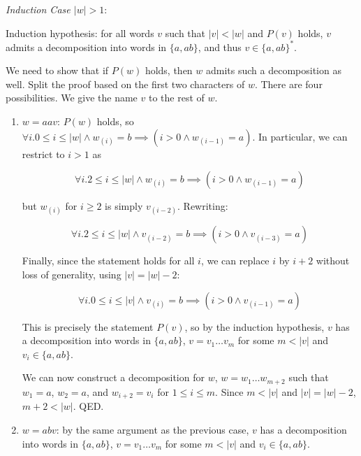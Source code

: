 \begin{exercise}{}
\begin{solution}
    \noindent
    \textit{Induction Case \(|w| > 1\)}: 

    Induction hypothesis: for all words \(v\) such that \(|v| < |w|\) and
    \(P(v)\) holds, \(v\) admits a decomposition into words in \(\{a, ab\}\),
    and thus \(v \in \{a, ab\}^*\).

    We need to show that if \(P(w)\) holds, then \(w\) admits such a
    decomposition as well. Split the proof based on the first two characters of
    \(w\). There are four possibilities. We give the name \(v\) to the rest of
    \(w\).

    \begin{enumerate}
      \item \(w = aav\): \(P(w)\) holds, so \(\forall i. 0 \le i \le |w| \land
      w_{(i)} = b \implies (i > 0 \land w_{(i - 1)} = a)\). In particular, we
      can restrict to \(i > 1\) as

      \begin{equation*}
        \forall i. 2 \le i \le |w| \land w_{(i)} = b \implies (i > 0 \land w_{(i - 1)} = a)
      \end{equation*}

      but \(w_{(i)}\) for \(i \geq 2\) is simply \(v_{(i - 2)}\). Rewriting:

      \begin{equation*}
        \forall i. 2 \le i \le |w| \land v_{(i - 2)} = b \implies (i > 0 \land v_{(i - 3)} = a)
      \end{equation*}

      Finally, since the statement holds for all \(i\), we can replace \(i\) by
      \(i + 2\) without loss of generality, using \(|v| = |w| - 2\):

      \begin{equation*}
        \forall i. 0 \le i \le |v| \land v_{(i)} = b \implies (i > 0 \land v_{(i - 1)} = a)
      \end{equation*}

      This is precisely the statement \(P(v)\), so by the induction hypothesis,
      \(v\) has a decomposition into words in \(\{a, ab\}\), \(v = v_1\ldots
      v_m\) for some \(m < |v|\) and \(v_i \in \{a, ab\}\).

      We can now construct a decomposition for \(w\), \(w = w_1\ldots w_{m+2}\)
      such that \(w_1 = a\), \(w_2 = a\), and \(w_{i + 2} = v_i\) for \(1 \le i
      \le m\). Since \(m < |v|\) and \(|v| = |w| - 2\), \(m + 2 < |w|\). QED.

      \item \(w = abv\): by the same argument as the previous case, \(v\) has a decomposition
      into words in \(\{a, ab\}\), \(v = v_1\ldots v_m\) for some \(m < |v|\)
      and \(v_i \in \{a, ab\}\). 
      

\end{enumerate}
\end{solution}
\end{exercise}
